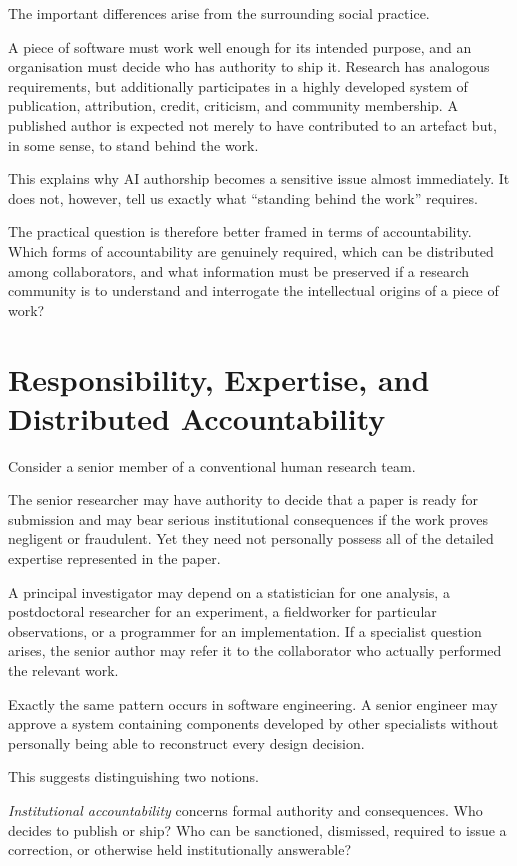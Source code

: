 \documentclass[12pt]{article}
\begin{document}
The important differences arise from the surrounding social practice.

A piece of software must work well enough for its intended purpose, and an organisation must decide who has authority to ship it. Research has analogous requirements, but additionally participates in a highly developed system of publication, attribution, credit, criticism, and community membership. A published author is expected not merely to have contributed to an artefact but, in some sense, to stand behind the work.

This explains why AI authorship becomes a sensitive issue almost immediately. It does not, however, tell us exactly what ``standing behind the work'' requires.

The practical question is therefore better framed in terms of accountability. Which forms of accountability are genuinely required, which can be distributed among collaborators, and what information must be preserved if a research community is to understand and interrogate the intellectual origins of a piece of work?

\section{Responsibility, Expertise, and Distributed Accountability}

Consider a senior member of a conventional human research team.

The senior researcher may have authority to decide that a paper is ready for submission and may bear serious institutional consequences if the work proves negligent or fraudulent. Yet they need not personally possess all of the detailed expertise represented in the paper.

A principal investigator may depend on a statistician for one analysis, a postdoctoral researcher for an experiment, a fieldworker for particular observations, or a programmer for an implementation. If a specialist question arises, the senior author may refer it to the collaborator who actually performed the relevant work.

Exactly the same pattern occurs in software engineering. A senior engineer may approve a system containing components developed by other specialists without personally being able to reconstruct every design decision.

This suggests distinguishing two notions.

\emph{Institutional accountability} concerns formal authority and consequences. Who decides to publish or ship? Who can be sanctioned, dismissed, required to issue a correction, or otherwise held institutionally answerable?
\end{document}
